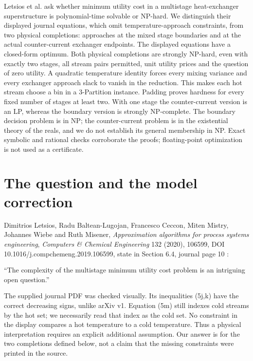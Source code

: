 \documentclass[11pt,a4paper]{report}
\begin{document}
\makepapertitle
\begin{paperabstract}
Letsios et al. ask whether minimum utility cost in a multistage heat-exchanger
superstructure is polynomial-time solvable or NP-hard. We distinguish their
displayed journal equations, which omit temperature-approach constraints, from
two physical completions: approaches at the mixed stage boundaries and at the
actual counter-current exchanger endpoints. The displayed equations have a
closed-form optimum. Both physical completions are strongly NP-hard, even with
exactly two stages, all stream pairs permitted, unit utility prices and the
question of zero utility. A quadratic temperature identity forces every mixing
variance and every exchanger approach slack to vanish in the reduction. This
makes each hot stream choose a bin in a 3-Partition instance. Padding proves
hardness for every fixed number of stages at least two. With one stage the
counter-current version is an LP, whereas the boundary version is strongly
NP-complete. The boundary decision problem is in NP; the counter-current
problem is in the existential theory of the reals, and we do not establish its
general membership in NP. Exact symbolic and rational checks corroborate the
proofs; floating-point optimization is not used as a certificate.
\end{paperabstract}

\section*{The question and the model correction}
Dimitrios Letsios, Radu Baltean-Lugojan, Francesco Ceccon, Miten Mistry,
Johannes Wiebe and Ruth Misener, \emph{Approximation algorithms for process
systems engineering}, \emph{Computers \& Chemical Engineering} 132 (2020),
106599, DOI 10.1016/j.compchemeng.2019.106599, state in Section 6.4,
journal page 10 \autocite{Letsios2020}:
\begin{openquote}
``The complexity of the multistage minimum utility cost problem is an intriguing open question.''
\end{openquote}
The supplied journal PDF was checked visually. Its inequalities (5j,k) have the
correct decreasing signs, unlike arXiv v1. Equation (5m) still indexes cold
streams by the hot set; we necessarily read that index as the cold set.
No constraint in the display compares a hot temperature to a cold temperature.
Thus a physical interpretation requires an explicit additional assumption.
Our answer is for the two completions defined below, not a claim that the
missing constraints were printed in the source.
\end{document}
